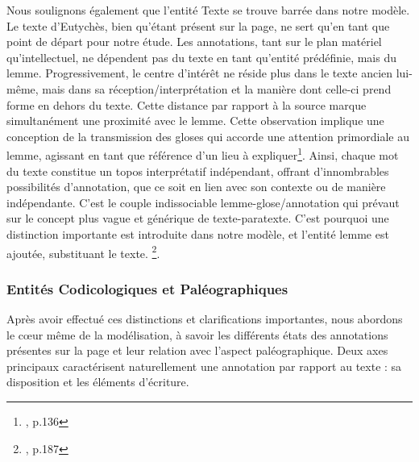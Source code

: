 \documentclass[a4paper, twoside, 12pt]{book}
\begin{document}
{Nous soulignons également que l'entité \og{}Texte\fg{} se trouve barrée dans notre modèle. Le texte d'Eutychès, bien qu'étant présent sur la page, ne sert qu'en tant que point de départ pour notre étude. Les annotations, tant sur le plan matériel qu'intellectuel, ne dépendent pas du texte en tant qu'entité prédéfinie, mais du lemme. Progressivement, le centre d'intérêt ne réside plus dans le texte ancien lui-même, mais dans sa réception/interprétation et la manière dont celle-ci prend forme en dehors du texte. Cette distance par rapport à la source marque simultanément une proximité avec le lemme. Cette observation implique une conception de la transmission des gloses qui accorde une attention primordiale au lemme, agissant en tant que référence d'un lieu à expliquer\footnote{\cite{oSullivanglossae}, p.136}. Ainsi, chaque mot du texte constitue un topos interprétatif indépendant, offrant d'innombrables possibilités d'annotation, que ce soit en lien avec son contexte ou de manière indépendante. C'est le couple indissociable lemme-glose/annotation qui prévaut sur le concept plus vague et générique de \og{}texte-paratexte\fg{}. C'est pourquoi une distinction importante est introduite dans notre modèle, et l'entité \og{}lemme\fg{} est ajoutée, substituant le texte. \footnote{\cite{cinato2015priscien}, p.187}.


\subsubsection{Entités Codicologiques et Paléographiques}

Après avoir effectué ces distinctions et clarifications importantes, nous abordons le cœur même de la modélisation, à savoir les différents états des annotations présentes sur la page et leur relation avec l'aspect paléographique. Deux axes principaux caractérisent naturellement une annotation par rapport au texte : sa disposition et les éléments d'écriture.\\

}
\end{document}
